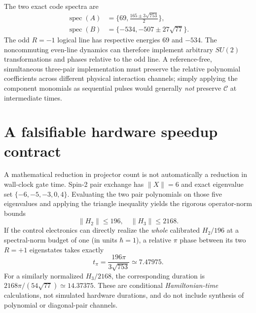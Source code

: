 \documentclass[aps,pra,twocolumn,nofootinbib,superscriptaddress,10pt]{revtex4-2}
\newcommand{\Cc}{\mathcal C}\newcommand{\HH}{\mathcal H}\newcommand{\Id}{\mathbb I}
\begin{document}
The two exact code spectra are
\begin{align}
\operatorname{spec}(A)&=\{69,\tfrac{165\pm3\sqrt{753}}2\},\\
\operatorname{spec}(B)&=\{-534,-507\pm27\sqrt{77}\}.
\end{align}
The odd $R=-1$ logical line has respective energies $69$ and $-534$. The noncommuting even-line dynamics can therefore implement arbitrary $SU(2)$ transformations and phases relative to the odd line. A reference-free, simultaneous three-pair implementation must preserve the relative polynomial coefficients across different physical interaction channels; simply applying the component monomials as sequential pulses would generally \emph{not} preserve $\Cc$ at intermediate times.

\section{A falsifiable hardware speedup contract}
A mathematical reduction in projector count is not automatically a reduction in wall-clock gate time. Spin-2 pair exchange has $\|X\|=6$ and exact eigenvalue set $\{-6,-5,-3,0,4\}$. Evaluating the two pair polynomials on those five eigenvalues and applying the triangle inequality yields the rigorous operator-norm bounds
\begin{equation}\label{eq:norm}
\boxed{\|H_2\|\le196,\quad\|H_3\|\le2168.}
\end{equation}
If the control electronics can directly realize the \emph{whole} calibrated $H_2/196$ at a spectral-norm budget of one (in units $\hbar=1$), a relative $\pi$ phase between its two $R=+1$ eigenstates takes exactly
\begin{equation}\label{eq:time}
 t_{\pi}=\frac{196\pi}{3\sqrt{753}}\simeq7.47975.
\end{equation}
For a similarly normalized $H_3/2168$, the corresponding duration is $2168\pi/(54\sqrt{77})\simeq14.37375$. These are conditional \emph{Hamiltonian-time} calculations, not simulated hardware durations, and do not include synthesis of polynomial or diagonal-pair channels.
\end{document}
